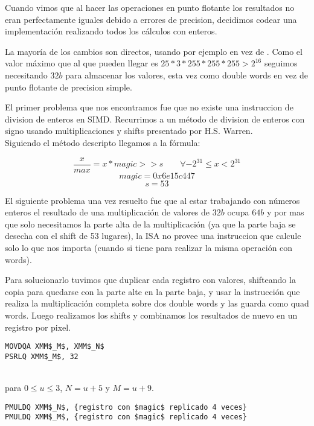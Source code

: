 Cuando vimos que al hacer las operaciones en punto flotante los resultados no eran perfectamente iguales debido a errores de precision, decidimos codear una implementación realizando todos los cálculos con enteros.

La mayoría de los cambios son directos, usando por ejemplo  en vez de . Como el valor máximo que al que pueden llegar es $25 * 3 * 255 * 255 * 255 > 2^{16}$ seguimos necesitando $32b$ para almacenar los valores, esta vez como double words en vez de punto flotante de precision simple.

El primer problema que nos encontramos fue que no existe una instruccion de division de enteros en SIMD. Recurrimos a un método de division de enteros con signo usando multiplicaciones y shifts presentado por H.S. Warren\textsuperscript{\cite[Chapter~10]{hackersdelight}}. \\
Siguiendo el método descripto llegamos a la fórmula:

$$ \frac{x}{max} = x * magic >> s \qquad \forall -2^{31} \le x < 2^{31} $$
$$ magic = 0x6e15c447 $$
$$ s = 53 $$

El siguiente problema una vez resuelto fue que al estar trabajando con números enteros el resultado de una multiplicación de valores de $32b$ ocupa $64b$ y por mas que solo necesitamos la parte alta de la multiplicación (ya que la parte baja se desecha con el shift de 53 lugares), la ISA no provee una instruccion que calcule solo lo que nos importa (cuando si tiene  para realizar la misma operación con words).

Para solucionarlo tuvimos que duplicar cada registro con valores, shifteando la copia para quedarse con la parte alte en la parte baja, y usar la instrucción  que realiza la multiplicación completa sobre dos double words y las guarda como quad words.
Luego realizamos los shifts y combinamos los resultados de nuevo en un registro por pixel.

\begin{lstlisting}
MOVDQA XMM$_M$, XMM$_N$
PSRLQ XMM$_M$, 32
\end{lstlisting}

 

  \\
para $0 \le u \le 3$, $N = u+5$ y $M = u+9$.

\begin{lstlisting}
PMULDQ XMM$_N$, {registro con $magic$ replicado 4 veces}
PMULDQ XMM$_M$, {registro con $magic$ replicado 4 veces}
\end{lstlisting}

